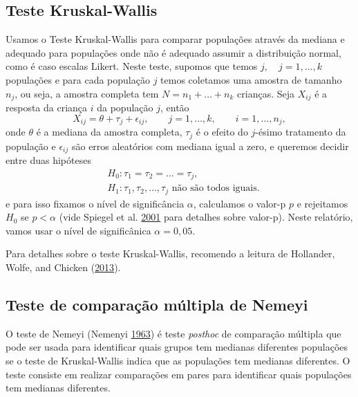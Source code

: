 \documentclass[]{article}
\begin{document}
\hypertarget{teste-kruskal-wallis}{%
\subsection{Teste Kruskal-Wallis}\label{teste-kruskal-wallis}}

Usamos o Teste Kruskal-Wallis para comparar populações através da mediana e adequado para populações onde não é adequado assumir a distribuição normal, como é caso escalas Likert. Neste teste, supomos que temos \(j,\quad j=1, \dots, k\) populações e para cada população \(j\) temos coletamos uma amostra de tamanho \(n_j\), ou seja, a amostra completa tem \(N = n_1 + \dots + n_k\) crianças. Seja \(X_{ij}\) é a resposta da criança \(i\) da população \(j\), então
\[
X_{ij} = \theta + \tau_j + \epsilon_{ij}, \qquad  j=1, \dots, k,\qquad i=1, \dots, n_j,
\]
onde \(\theta\) é a mediana da amostra completa, \(\tau_j\) é o efeito do \(j\)-ésimo tratamento da população e \(\epsilon_{ij}\) são erros aleatórios com mediana igual a zero, e queremos decidir entre duas hipóteses
\[
\begin{split}
&H_0: \tau_1 = \tau_2 = \dots = \tau_j,\\
&H_1: \tau_1, \tau_2, \dots,  \tau_j \mbox{ não são todos iguais}.
\end{split}
\]
e para isso fixamos o nível de significância \(\alpha\), calculamos o valor-p \(p\) e rejeitamos \(H_0\) se \(p < \alpha\) (vide Spiegel et al. \protect\hyperlink{ref-spiegel2001probability}{2001} para detalhes sobre valor-p). Neste relatório, vamos usar o nível de significânica \(\alpha=0,05\).

Para detalhes sobre o teste Kruskal-Wallis, recomendo a leitura de Hollander, Wolfe, and Chicken (\protect\hyperlink{ref-hollander2013nonparametric}{2013}).

\hypertarget{teste-de-comparauxe7uxe3o-muxfaltipla-de-nemeyi}{%
\subsection{Teste de comparação múltipla de Nemeyi}\label{teste-de-comparauxe7uxe3o-muxfaltipla-de-nemeyi}}

O teste de Nemeyi (Nemenyi \protect\hyperlink{ref-nemenyi1963distribution}{1963}) é teste \emph{posthoc} de comparação múltipla que pode ser usada para identificar quais grupos tem medianas diferentes populações se o teste de Kruskal-Wallis indica que as populações tem medianas diferentes. O teste consiste em realizar comparações em pares para identificar quais populações tem medianas diferentes.
\end{document}
